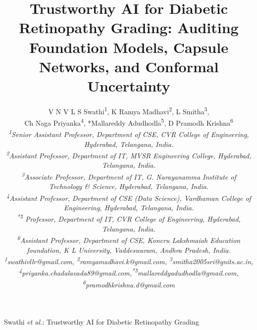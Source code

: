 \documentclass[journal]{IEEEtran}
\begin{document}
\title{Trustworthy AI for Diabetic Retinopathy Grading:
    Auditing Foundation Models, Capsule Networks,
    and Conformal Uncertainty}

\author{%
    V N V L S Swathi\textsuperscript{1}, K Ramya Madhavi\textsuperscript{2}, L Smitha\textsuperscript{3},\\
    Ch Naga Priyanka\textsuperscript{4}, *Mallareddy Adudhodla\textsuperscript{5}, D Pramodh Krishna\textsuperscript{6}\\[4pt]
    {\itshape\footnotesize
        \textsuperscript{1}Senior Assistant Professor, Department of CSE, CVR College of Engineering, Hyderabad, Telangana, India.\\
        \textsuperscript{2}Assistant Professor, Department of IT, MVSR Engineering College, Hyderabad, Telangana, India.\\
        \textsuperscript{3}Associate Professor, Department of IT, G. Narayanamma Institute of Technology \& Science, Hyderabad, Telangana, India.\\
        \textsuperscript{4}Assistant Professor, Department of CSE (Data Science), Vardhaman College of Engineering, Hyderabad, Telangana, India.\\
        \textsuperscript{*}\textsuperscript{5} Professor, Department of IT, CVR College of Engineering, Hyderabad, Telangana, India.\\
        \textsuperscript{6}Assistant Professor, Department of CSE, Koneru Lakshmaiah Education foundation, K L University, Vaddeswaram, Andhra Pradesh, India.\\
        \textsuperscript{1}swathivllr@gmail.com, \textsuperscript{2}ramyamadhavi.k@gmail.com, \textsuperscript{3}smitha2005sri@gnits.ac.in,\\
        \textsuperscript{4}priyanka.chadalavada89@gmail.com,\textsuperscript{*5}mallareddyadudhodla@gmail.com, \textsuperscript{6}pramodhkrishna.d@gmail.com}%
}

%
{Swathi \MakeLowercase{\textit{et al.}}: Trustworthy AI for Diabetic Retinopathy Grading}

\maketitle
\end{document}
